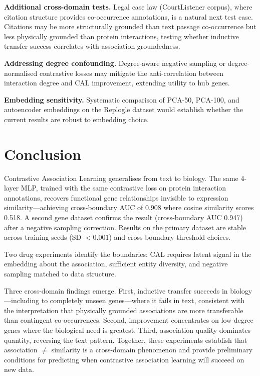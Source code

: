 \documentclass[11pt]{article}
\begin{document}
\textbf{Additional cross-domain tests.} Legal case law (CourtListener corpus), where citation structure provides co-occurrence annotations, is a natural next test case. Citations may be more structurally grounded than text passage co-occurrence but less physically grounded than protein interactions, testing whether inductive transfer success correlates with association groundedness.

\textbf{Addressing degree confounding.} Degree-aware negative sampling or degree-normalised contrastive losses may mitigate the anti-correlation between interaction degree and CAL improvement, extending utility to hub genes.

\textbf{Embedding sensitivity.} Systematic comparison of PCA-50, PCA-100, and autoencoder embeddings on the Replogle dataset would establish whether the current results are robust to embedding choice.

\section{Conclusion}
\label{sec:conclusion}

Contrastive Association Learning generalises from text to biology. The same 4-layer MLP, trained with the same contrastive loss on protein interaction annotations, recovers functional gene relationships invisible to expression similarity---achieving cross-boundary AUC of 0.908 where cosine similarity scores 0.518. A second gene dataset confirms the result (cross-boundary AUC 0.947) after a negative sampling correction. Results on the primary dataset are stable across training seeds (SD $< 0.001$) and cross-boundary threshold choices.

Two drug experiments identify the boundaries: CAL requires latent signal in the embedding about the association, sufficient entity diversity, and negative sampling matched to data structure.

Three cross-domain findings emerge. First, inductive transfer succeeds in biology---including to completely unseen genes---where it fails in text, consistent with the interpretation that physically grounded associations are more transferable than contingent co-occurrences. Second, improvement concentrates on low-degree genes where the biological need is greatest. Third, association quality dominates quantity, reversing the text pattern. Together, these experiments establish that association $\neq$ similarity is a cross-domain phenomenon and provide preliminary conditions for predicting when contrastive association learning will succeed on new data.
\end{document}
